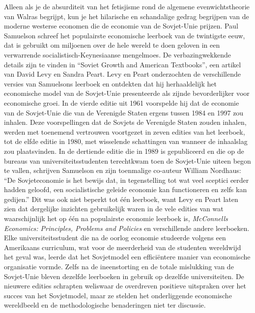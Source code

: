 Alleen als je de absurditeit van het fetisjisme rond de algemene evenwichtstheorie van Walras begrijpt, kun je het hilarische en schandalige gedrag begrijpen van de moderne westerse economen die de economie van de Sovjet-Unie prijzen. Paul Samuelson schreef het populairste economische leerboek van de twintigste eeuw, dat is gebruikt om miljoenen over de hele wereld te doen geloven in een verwarrende socialistisch-Keynesiaanse mengelmoes. De verbazingwekkende details zijn te vinden in ``Soviet Growth and American Textbooks'', een artikel van David Levy en Sandra Peart.\autocite{142} Levy en Peart onderzochten de verschillende versies van Samuelsons leerboek en ontdekten dat hij herhaaldelijk het economische model van de Sovjet-Unie presenteerde als zijnde bevorderlijker voor economische groei. In de vierde editie uit 1961 voorspelde hij dat de economie van de Sovjet-Unie die van de Verenigde Staten ergens tussen 1984 en 1997 zou inhalen. Deze voorspellingen dat de Sovjets de Verenigde Staten zouden inhalen, werden met toenemend vertrouwen voortgezet in zeven edities van het leerboek, tot de elfde editie in 1980, met wisselende schattingen van wanneer de inhaalslag zou plaatsvinden. In de dertiende editie die in 1989 is gepubliceerd en die op de bureaus van universiteitsstudenten terechtkwam toen de Sovjet-Unie uiteen begon te vallen, schrijven Samuelson en zijn toenmalige co-auteur William Nordhaus: ``De Sovjeteconomie is het bewijs dat, in tegenstelling tot wat veel sceptici eerder hadden geloofd, een socialistische geleide economie kan functioneren en zelfs kan gedijen.''\autocite{143} Dit was ook niet beperkt tot één leerboek, want Levy en Peart laten zien dat dergelijke inzichten gebruikelijk waren in de vele edities van wat waarschijnlijk het op één na populairste economie leerboek is, \emph{McConnell\textquotesingle s Economics: Principles, Problems and Policies} en verschillende andere leerboeken.\autocite{144} Elke universiteitsstudent die na de oorlog economie studeerde volgens een Amerikaans curriculum, wat voor de meerderheid van de studenten wereldwijd het geval was, leerde dat het Sovjetmodel een efficiëntere manier van economische organisatie vormde. Zelfs na de ineenstorting en de totale mislukking van de Sovjet-Unie bleven dezelfde leerboeken in gebruik op dezelfde universiteiten. De nieuwere edities schrapten weliswaar de overdreven positieve uitspraken over het succes van het Sovjetmodel, maar ze stelden het onderliggende economische wereldbeeld en de methodologische benaderingen niet ter discussie.\autocite{145}

